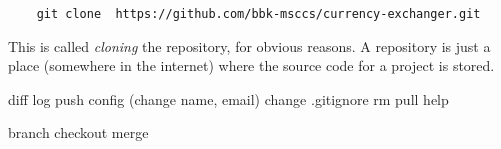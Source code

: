 \begin{verbatim}
    git clone  https://github.com/bbk-msccs/currency-exchanger.git
\end{verbatim}

This is called \emph{cloning} the repository, for obvious reasons. A
repository is just a place (somewhere in the internet) where the
source code for a project is stored. 

diff
log
push
config (change name, email)
change .gitignore
rm
pull
help

branch
checkout %
merge



